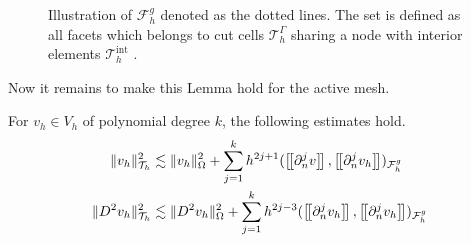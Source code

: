\begin{figure}

\caption{Illustration of $\mathcal{F} _{h}^{g}$ denoted as the dotted lines. The set is defined as all facets which belongs to cut cells $\mathcal{T} ^{\Gamma }_{h}$ sharing a node with interior elements $\mathcal{T} ^{\mathrm{int}  }_{h}$ .  }
\label{fig:illustration_F_g}
\end{figure}


Now it remains to make this Lemma hold for the active mesh.


\begin{lemma}
    \label{lemma:bi_inv_gh_lemma}
    For $v_{h} \in  V_{h}$ of polynomial degree $k$, the following estimates hold.
        \begin{align}
            \label{eq:bi_inv_gh_1}
        \| v_h \|_{ \mathcal{T} _{h} }^{ 2 }  & \lesssim  \| v_h \|_{ \Omega  }^{ 2 }  + \sum_{j=1}^{k} h^{2j+1} ( \jump{ \partial ^{j}_{n} v }, \jump{ \partial ^{j}_{n} v_h}    )_{\mathcal{F}_{h}^{g}}\\
            \label{eq:bi_inv_gh_2}
        \| D ^2 v_h \|_{ \mathcal{T} _{h} }^{ 2 }  & \lesssim  \| D^2 v_h \|_{ \Omega  }^{ 2 }  + \sum_{j=1}^{k} h^{2j-3} ( \jump{ \partial ^{j}_{n} v_h }, \jump{ \partial ^{j}_{n}v_h }    )_{\mathcal{F}_{h}^{g}}
        \end{align}
\end{lemma}

